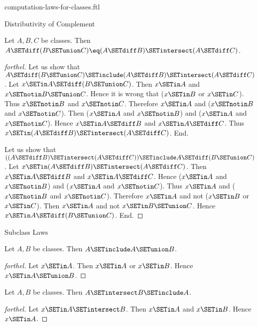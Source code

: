 \documentclass{stex}
\begin{document}
\begin{smodule}{computation-laws-for-classes.ftl}
\begin{sfragment}{Distributivity of Complement}
  \begin{proposition}[forthel,id=FOUNDATIONS_02_2909554153095168]
    Let $A, B, C$ be classes.
    Then $A \SETdiff (B \SETunion C) \eq (A \SETdiff B) \SETintersect (A \SETdiff C)$.
  \end{proposition}
  \begin{proof}[forthel]
    Let us show that $A \SETdiff (B \SETunion C) \SETinclude (A \SETdiff B) \SETintersect (A \SETdiff C)$.
      Let $x \SETin A \SETdiff (B \SETunion C)$.
      Then $x \SETin A$ and $x \SETnotin B \SETunion C$.
      Hence it is wrong that ($x \SETin B$ or $x \SETin C$).
      Thus $x \SETnotin B$ and $x \SETnotin C$.
      Therefore $x \SETin A$ and ($x \SETnotin B$ and $x \SETnotin C$).
      Then ($x \SETin A$ and $x \SETnotin B$) and ($x \SETin A$ and $x \SETnotin C$).
      Hence $x \SETin A \SETdiff B$ and $x \SETin A \SETdiff C$.
      Thus $x \SETin (A \SETdiff B) \SETintersect (A \SETdiff C)$.
    End.

    Let us show that $((A \SETdiff B) \SETintersect (A \SETdiff C)) \SETinclude A \SETdiff (B \SETunion C)$. %
      Let $x \SETin (A \SETdiff B) \SETintersect (A \SETdiff C)$.
      Then $x \SETin A \SETdiff B$ and $x \SETin A \SETdiff C$.
      Hence ($x \SETin A$ and $x \SETnotin B$) and ($x \SETin A$ and $x \SETnotin C$).
      Thus $x \SETin A$ and ($x \SETnotin B$ and $x \SETnotin C$).
      Therefore $x \SETin A$ and not ($x \SETin B$ or $x \SETin C$).
      Then $x \SETin A$ and not $x \SETin B \SETunion C$.
      Hence $x \SETin A \SETdiff (B \SETunion C)$.
    End.
  \end{proof}
\end{sfragment}

\begin{sfragment}{Subclass Laws}
  \begin{proposition}[forthel,id=FOUNDATIONS_02_3793981508943872]
    Let $A, B$ be classes.
    Then $A \SETinclude A \SETunion B$.
  \end{proposition}
  \begin{proof}[forthel]
    Let $x \SETin A$.
    Then $x \SETin A$ or $x \SETin B$.
    Hence $x \SETin A \SETunion B$.
  \end{proof}

  \begin{proposition}[forthel,id=FOUNDATIONS_02_1591517646946304]
    Let $A, B$ be classes.
    Then $A \SETintersect B \SETinclude A$.
  \end{proposition}
  \begin{proof}[forthel]
    Let $x \SETin A \SETintersect B$.
    Then $x \SETin A$ and $x \SETin B$.
    Hence $x \SETin A$.
  \end{proof}


\end{sfragment}
\end{smodule}
\end{document}
